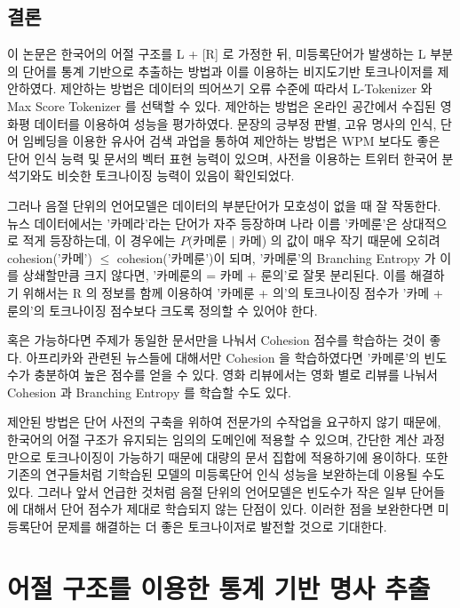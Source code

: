 \documentclass[11pt]{article}
\begin{document}
\subsection{결론}
이 논문은 한국어의 어절 구조를 L + [R] 로 가정한 뒤, 미등록단어가 발생하는 L 부분의 단어를 통계 기반으로 추출하는 방법과 이를 이용하는 비지도기반 토크나이저를 제안하였다.
제안하는 방법은 데이터의 띄어쓰기 오류 수준에 따라서 L-Tokenizer 와 Max Score Tokenizer 를 선택할 수 있다.
제안하는 방법은 온라인 공간에서 수집된 영화평 데이터를 이용하여 성능을 평가하였다.
문장의 긍부정 판별, 고유 명사의 인식, 단어 임베딩을 이용한 유사어 검색 과업을 통하여 제안하는 방법은 WPM 보다도 좋은 단어 인식 능력 및 문서의 벡터 표현 능력이 있으며, 사전을 이용하는 트위터 한국어 분석기와도 비슷한 토크나이징 능력이 있음이 확인되었다.

그러나 음절 단위의 언어모델은 데이터의 부분단어가 모호성이 없을 때 잘 작동한다.
뉴스 데이터에서는 '카메라'라는 단어가 자주 등장하며 나라 이름 '카메룬'은 상대적으로 적게 등장하는데, 이 경우에는 $P$(카메룬 $\vert$ 카메) 의 값이 매우 작기 때문에 오히려 cohesion('카메') $\le$ cohesion('카메룬')이 되며, '카메룬'의 Branching Entropy 가 이를 상쇄할만큼 크지 않다면, '카메룬의 = 카메 + 룬의'로 잘못 분리된다.
이를 해결하기 위해서는 R 의 정보를 함께 이용하여 '카메룬 + 의'의 토크나이징 점수가 '카메 + 룬의'의 토크나이징 점수보다 크도록 정의할 수 있어야 한다.

혹은 가능하다면 주제가 동일한 문서만을 나눠서 Cohesion 점수를 학습하는 것이 좋다.
아프리카와 관련된 뉴스들에 대해서만 Cohesion 을 학습하였다면 '카메룬'의 빈도수가 충분하여 높은 점수를 얻을 수 있다.
영화 리뷰에서는 영화 별로 리뷰를 나눠서 Cohesion 과 Branching Entropy 를 학습할 수도 있다.

제안된 방법은 단어 사전의 구축을 위하여 전문가의 수작업을 요구하지 않기 때문에, 한국어의 어절 구조가 유지되는 임의의 도메인에 적용할 수 있으며, 간단한 계산 과정만으로 토크나이징이 가능하기 때문에 대량의 문서 집합에 적용하기에 용이하다.
또한 기존의 \citep{zhao2007incorporating, zhao2011integrating, zheng2013deep} 연구들처럼 기학습된 모델의 미등록단어 인식 성능을 보완하는데 이용될 수도 있다.
그러나 앞서 언급한 것처럼 음절 단위의 언어모델은 빈도수가 작은 일부 단어들에 대해서 단어 점수가 제대로 학습되지 않는 단점이 있다.
이러한 점을 보완한다면 미등록단어 문제를 해결하는 더 좋은 토크나이저로 발전할 것으로 기대한다.



\newpage
\section{어절 구조를 이용한 통계 기반 명사 추출} \label{noun_extraction}
\end{document}
